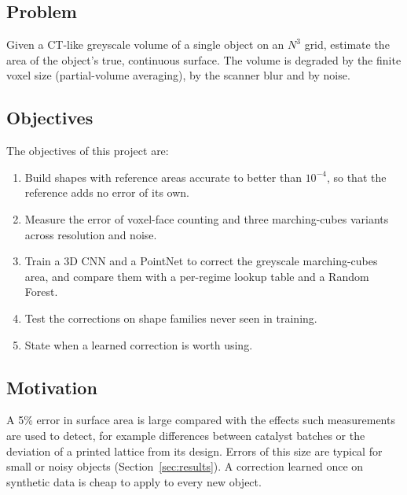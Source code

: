 \subsection{Problem}
Given a CT-like greyscale volume of a single object on an $N^3$ grid, estimate the area of the object's
true, continuous surface. The volume is degraded by the finite voxel size (partial-volume averaging),
by the scanner blur and by noise.

\subsection{Objectives}
The objectives of this project are:
\begin{enumerate}
  \item Build shapes with reference areas accurate to better than $10^{-4}$, so that the reference adds
        no error of its own.
  \item Measure the error of voxel-face counting and three marching-cubes variants across resolution
        and noise.
  \item Train a 3D CNN and a PointNet to correct the greyscale marching-cubes area, and compare them
        with a per-regime lookup table and a Random Forest.
  \item Test the corrections on shape families never seen in training.
  \item State when a learned correction is worth using.
\end{enumerate}

\subsection{Motivation}
A 5\% error in surface area is large compared with the effects such measurements are used to detect,
for example differences between catalyst batches or the deviation of a printed lattice from its design.
Errors of this size are typical for small or noisy objects (Section~\ref{sec:results}). A correction
learned once on synthetic data is cheap to apply to every new object.
